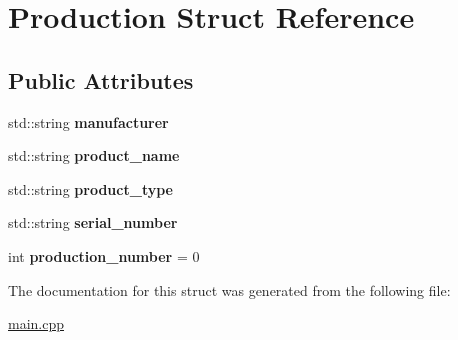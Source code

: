 \hypertarget{struct_production}{}\section{Production Struct Reference}
\label{struct_production}
\subsection*{Public Attributes}
\begin{DoxyCompactItemize}
\item 
\mbox{\label{struct_production_a87007a163938f183afa7af09fe25198c}} 
std\+::string {\bfseries manufacturer}
\item 
\mbox{\label{struct_production_adaa596240adcfd895ebd296065551b91}} 
std\+::string {\bfseries product\+\_\+name}
\item 
\mbox{\label{struct_production_a027996f315838203ec625b50f9274a9d}} 
std\+::string {\bfseries product\+\_\+type}
\item 
\mbox{\label{struct_production_a2f212dcba25617156d057ae82f0a9506}} 
std\+::string {\bfseries serial\+\_\+number}
\item 
\mbox{\label{struct_production_ab7f4c8263e2012c2a325ffcfd966086d}} 
int {\bfseries production\+\_\+number} = 0
\end{DoxyCompactItemize}


The documentation for this struct was generated from the following file\+:\begin{DoxyCompactItemize}
\item 
\mbox{\hyperlink{main_8cpp}{main.\+cpp}}\end{DoxyCompactItemize}
